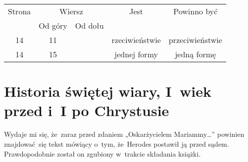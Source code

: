 \documentclass[a4paper,11pt]{article}
\begin{document}
\begin{center}

  \begin{tabular}{|c|c|c|c|c|}
    \hline
    Strona & \multicolumn{2}{c|}{Wiersz} & Jest
                              & Powinno być \\ \cline{2-3}
    & Od góry & Od dołu & & \\
    \hline
    14 & 11 & & rzeciwieństwie & przeciwieństwie \\
    14 & 15 & & jednej formy & jedną formę \\
    \hline
  \end{tabular}

\end{center}

\vspace{\spaceTwo}













\newpage

\section{Historia świętej wiary, I~wiek przed i~I po Chrystusie}

\vspace{\spaceTwo}




\vspace{0em}



\vspace{0em}


\noindent
{} Wydaje mi się, że~zaraz przed zdaniem
„Oskarżycielem Mariammy\ldots” powinien znajdować~się tekst mówiący
o~tym, że~Herodes postawił ją przed sądem. Prawdopodobnie został on
zgubiony w~trakcie składania książki.
\end{document}
